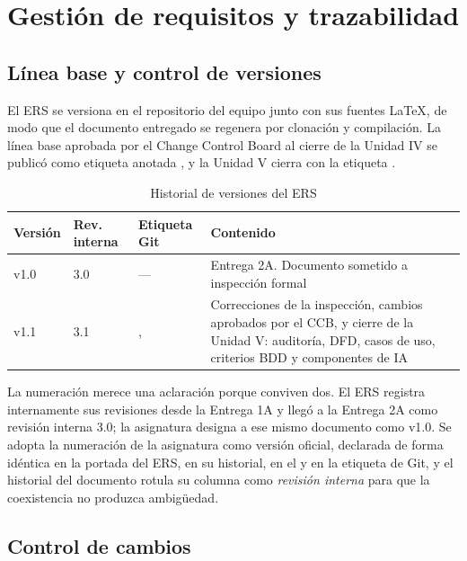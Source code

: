 \section{Gestión de requisitos y trazabilidad}
\label{sec:gestion}

\subsection{Línea base y control de versiones}

El ERS se versiona en el repositorio del equipo junto con sus fuentes \LaTeX{}, de modo que el
documento entregado se regenera por clonación y compilación. La línea base aprobada por el Change
Control Board al cierre de la Unidad IV se publicó como etiqueta anotada , y la
Unidad V cierra con la etiqueta .

\begin{table}[H]
\centering\footnotesize
\caption{Historial de versiones del ERS}
\label{tab:versiones}
\begin{tabular}{|C{2.0cm}|C{2.2cm}|C{2.4cm}|L{7.4cm}|}
\hline
{}\textbf{Versión} & \textbf{Rev. interna} & \textbf{Etiqueta Git} & \textbf{Contenido}\\ \hline
v1.0 & 3.0 & --- & Entrega 2A. Documento sometido a inspección formal\\ \hline
v1.1 & 3.1 & ,  & Correcciones de la inspección, cambios aprobados por el CCB, y cierre de la Unidad V: auditoría, DFD, casos de uso, criterios BDD y componentes de IA\\ \hline
\end{tabular}
\end{table}

\noindent
La numeración merece una aclaración porque conviven dos. El ERS registra internamente sus revisiones
desde la Entrega 1A y llegó a la Entrega 2A como revisión interna 3.0; la asignatura designa a ese
mismo documento como v1.0. Se adopta la numeración de la asignatura como versión oficial, declarada
de forma idéntica en la portada del ERS, en su historial, en el  y en la etiqueta de
Git, y el historial del documento rotula su columna como \emph{revisión interna} para que la
coexistencia no produzca ambigüedad.

\subsection{Control de cambios}

